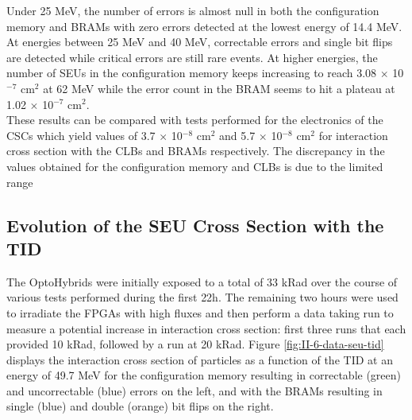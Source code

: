       Under 25 MeV, the number of errors is almost null in both the configuration memory and BRAMs with zero errors detected at the lowest energy of 14.4 MeV. At energies between 25 MeV and 40 MeV, correctable errors and single bit flips are detected while critical errors are still rare events. At higher energies, the number of SEUs in the configuration memory keeps increasing to reach 3.08 $ \times $ 10$^{-7}$ cm$^{2}$ at 62 MeV while the error count in the BRAM seems to hit a plateau at 1.02 $ \times $ 10$^{-7}$ cm$^2$. \\

      These results can be compared with tests performed for the electronics of the CSCs \cite{Bylsma2013242} which yield values of 3.7 $ \times $ 10$^{-8}$ cm$^2$ and 5.7 $ \times $ 10$^{-8}$ cm$^2$ for interaction cross section with the CLBs and BRAMs respectively. The discrepancy in the values obtained for the configuration memory and CLBs is due to the limited range


    \subsection{Evolution of the SEU Cross Section with the TID}

      The OptoHybrids were initially exposed to a total of 33 kRad over the course of various tests performed during the first 22h. The remaining two hours were used to irradiate the FPGAs with high fluxes and then perform a data taking run to measure a potential increase in interaction cross section: first three runs that each provided 10 kRad, followed by a run at 20 kRad. Figure \ref{fig:II-6-data-seu-tid} displays the interaction cross section of particles as a function of the TID at an energy of 49.7 MeV for the configuration memory resulting in correctable (green) and uncorrectable (blue) errors on the left, and with the BRAMs resulting in single (blue) and double (orange) bit flips on the right. \\

